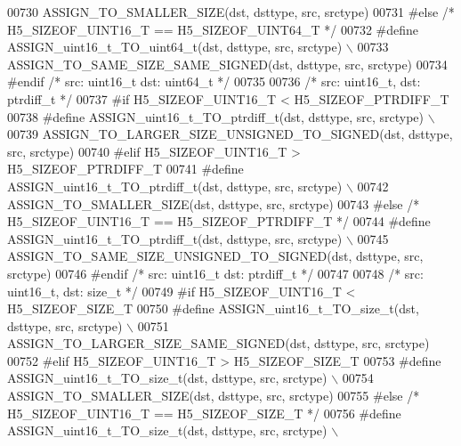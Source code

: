 \begin{DoxyCode}
00730 \textcolor{preprocessor}{        ASSIGN\_TO\_SMALLER\_SIZE(dst, dsttype, src, srctype)}
00731 \textcolor{preprocessor}{#else }\textcolor{comment}{/* H5\_SIZEOF\_UINT16\_T == H5\_SIZEOF\_UINT64\_T */}\textcolor{preprocessor}{}
00732 \textcolor{preprocessor}{    #define ASSIGN\_uint16\_t\_TO\_uint64\_t(dst, dsttype, src, srctype) \(\backslash\)}
00733 \textcolor{preprocessor}{        ASSIGN\_TO\_SAME\_SIZE\_SAME\_SIGNED(dst, dsttype, src, srctype)}
00734 \textcolor{preprocessor}{#endif }\textcolor{comment}{/* src: uint16\_t dst: uint64\_t */}\textcolor{preprocessor}{}
00735 
00736 \textcolor{comment}{/* src: uint16\_t, dst: ptrdiff\_t */}
00737 \textcolor{preprocessor}{#if H5\_SIZEOF\_UINT16\_T < H5\_SIZEOF\_PTRDIFF\_T}
00738 \textcolor{preprocessor}{    #define ASSIGN\_uint16\_t\_TO\_ptrdiff\_t(dst, dsttype, src, srctype) \(\backslash\)}
00739 \textcolor{preprocessor}{        ASSIGN\_TO\_LARGER\_SIZE\_UNSIGNED\_TO\_SIGNED(dst, dsttype, src, srctype)}
00740 \textcolor{preprocessor}{#elif H5\_SIZEOF\_UINT16\_T > H5\_SIZEOF\_PTRDIFF\_T}
00741 \textcolor{preprocessor}{    #define ASSIGN\_uint16\_t\_TO\_ptrdiff\_t(dst, dsttype, src, srctype) \(\backslash\)}
00742 \textcolor{preprocessor}{        ASSIGN\_TO\_SMALLER\_SIZE(dst, dsttype, src, srctype)}
00743 \textcolor{preprocessor}{#else }\textcolor{comment}{/* H5\_SIZEOF\_UINT16\_T == H5\_SIZEOF\_PTRDIFF\_T */}\textcolor{preprocessor}{}
00744 \textcolor{preprocessor}{    #define ASSIGN\_uint16\_t\_TO\_ptrdiff\_t(dst, dsttype, src, srctype) \(\backslash\)}
00745 \textcolor{preprocessor}{        ASSIGN\_TO\_SAME\_SIZE\_UNSIGNED\_TO\_SIGNED(dst, dsttype, src, srctype)}
00746 \textcolor{preprocessor}{#endif }\textcolor{comment}{/* src: uint16\_t dst: ptrdiff\_t */}\textcolor{preprocessor}{}
00747 
00748 \textcolor{comment}{/* src: uint16\_t, dst: size\_t */}
00749 \textcolor{preprocessor}{#if H5\_SIZEOF\_UINT16\_T < H5\_SIZEOF\_SIZE\_T}
00750 \textcolor{preprocessor}{    #define ASSIGN\_uint16\_t\_TO\_size\_t(dst, dsttype, src, srctype) \(\backslash\)}
00751 \textcolor{preprocessor}{        ASSIGN\_TO\_LARGER\_SIZE\_SAME\_SIGNED(dst, dsttype, src, srctype)}
00752 \textcolor{preprocessor}{#elif H5\_SIZEOF\_UINT16\_T > H5\_SIZEOF\_SIZE\_T}
00753 \textcolor{preprocessor}{    #define ASSIGN\_uint16\_t\_TO\_size\_t(dst, dsttype, src, srctype) \(\backslash\)}
00754 \textcolor{preprocessor}{        ASSIGN\_TO\_SMALLER\_SIZE(dst, dsttype, src, srctype)}
00755 \textcolor{preprocessor}{#else }\textcolor{comment}{/* H5\_SIZEOF\_UINT16\_T == H5\_SIZEOF\_SIZE\_T */}\textcolor{preprocessor}{}
00756 \textcolor{preprocessor}{    #define ASSIGN\_uint16\_t\_TO\_size\_t(dst, dsttype, src, srctype) \(\backslash\)}

\end{DoxyCode}
